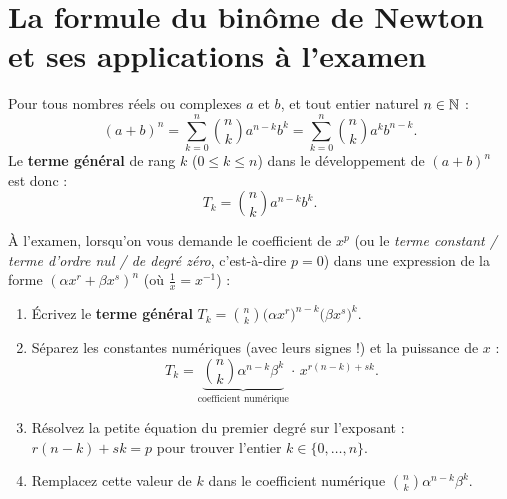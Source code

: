 \section{La formule du binôme de Newton et ses applications à l'examen}

\begin{theoreme}
Pour tous nombres réels ou complexes $a$ et $b$, et tout entier naturel $n \in \mathbb{N}$ :
\[
    \boxed{(a + b)^n = \sum_{k=0}^n \binom{n}{k} a^{n-k} b^k = \sum_{k=0}^n \binom{n}{k} a^k b^{n-k}}.
\]
Le \textbf{terme général} de rang $k$ ($0 \le k \le n$) dans le développement de $(a + b)^n$ est donc :
\[
    \boxed{T_k = \binom{n}{k} a^{n-k} b^k}.
\]
\end{theoreme}

\begin{astuce}
À l'examen, lorsqu'on vous demande le coefficient de $x^p$ (ou le \emph{terme constant / terme d'ordre nul / de degré zéro}, c'est-à-dire $p = 0$) dans une expression de la forme $\left(\alpha x^r + \beta x^s\right)^n$ (où $\frac{1}{x} = x^{-1}$) :
\begin{enumerate}
    \item Écrivez le \textbf{terme général} $T_k = \binom{n}{k} \bigl(\alpha x^r\bigr)^{n-k} \bigl(\beta x^s\bigr)^k$.
    \item Séparez les constantes numériques (avec leurs signes !) et la puissance de $x$ :
    \[
        T_k = \underbrace{\binom{n}{k} \alpha^{n-k} \beta^k}_{\text{coefficient numérique}} \cdot \, x^{r(n-k) + sk}.
    \]
    \item Résolvez la petite équation du premier degré sur l'exposant : $\boxed{r(n - k) + sk = p}$ pour trouver l'entier $k \in \{0, \dots, n\}$.
    \item Remplacez cette valeur de $k$ dans le coefficient numérique $\binom{n}{k} \alpha^{n-k} \beta^k$.
\end{enumerate}
\end{astuce}

